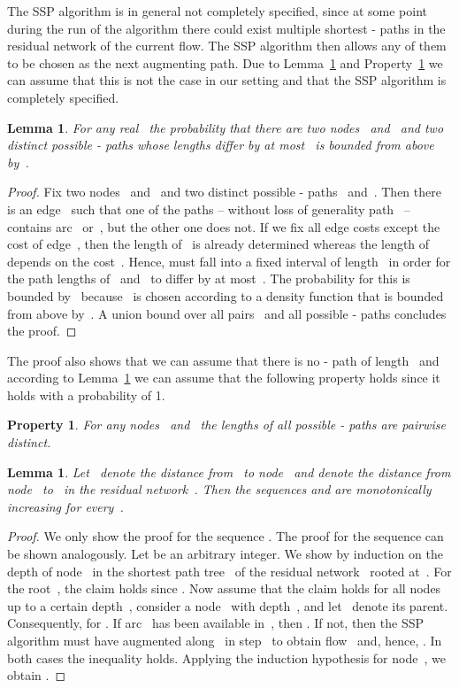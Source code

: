 \documentclass[11pt]{article}
\newtheorem{lemma}[theorem]{Lemma}
\newtheorem{property}[theorem]{Property}
\begin{document}
The SSP algorithm is in general not completely specified, since at some point during the run of the algorithm there could exist multiple shortest - paths in the residual network of the current flow.
The SSP algorithm then allows any of them to be chosen as the next augmenting path. Due to Lemma~\ref{lemma:different path lengths} and Property~\ref{property:different path lengths} we can assume that this is not the case in our setting and that the SSP algorithm is completely specified.

\begin{lemma}
\label{lemma:different path lengths}
For any real~ the probability that there are two nodes~ and~ and two distinct possible - paths whose lengths differ by at most~ is bounded from above by~.
\end{lemma}

\begin{proof}
Fix two nodes~ and~ and two distinct possible - paths~ and~. Then there is an edge~ such that one of the paths -- without loss of generality path~ -- contains arc~ or~, but the other one does not. If we fix all edge costs except the cost of edge~, then the length of~ is already determined whereas the length of~ depends on the cost~. Hence,  must fall into a fixed interval of length~ in order for the path lengths of~ and~ to differ by at most~. The probability for this is bounded by~ because~ is chosen according to a density function that is bounded from above by~. A union bound over all pairs~ and all possible - paths concludes the proof. \end{proof}

The proof also shows that we can assume that there is no - path of length~ and according to Lemma~\ref{lemma:different path lengths} we can assume that the following property holds since it holds with a probability of 1.

\begin{property}
\label{property:different path lengths}
For any nodes~ and~ the lengths of all possible - paths are pairwise distinct.
\end{property}

\begin{lemma}\label{lemma:distance monotonicity}
Let~ denote the distance from~ to node~ and  denote the distance from node~ to~ in the residual network~. Then
the sequences  and  are monotonically increasing
for every~.
\end{lemma}

\begin{proof}
We only show the proof for the sequence . The proof for the sequence  can be shown analogously.
Let  be an arbitrary integer. We show  by induction on the depth of node~ in the shortest path tree~ of the residual network~ rooted at~. For the root~, the claim holds since . Now assume that the claim holds for all nodes up to a certain depth~, consider a node~ with depth~, and let~ denote its parent. Consequently,  for . If arc~ has been available in~, then . If not, then the SSP algorithm must have augmented along~ in step~ to obtain flow~ and, hence, . In both cases the inequality  holds. Applying the induction hypothesis for node~, we obtain
.
\end{proof}
\end{document}
